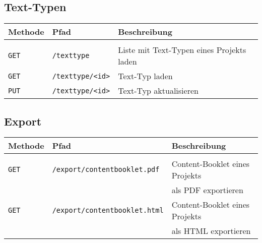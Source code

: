 \subsection{Text-Typen}

\begin{tabular}{@{}l l l}
\textbf{Methode} & \textbf{Pfad} & \textbf{Beschreibung}\\
\hline\\[-1.5ex]
\texttt{GET} & \texttt{/texttype} & Liste mit Text-Typen eines Projekts laden\\
\texttt{GET} & \texttt{/texttype/<id>} & Text-Typ laden\\
\texttt{PUT} & \texttt{/texttype/<id>} & Text-Typ aktualisieren\\
\end{tabular}

\subsection{Export}

\begin{tabular}{@{}l l l}
\textbf{Methode} & \textbf{Pfad} & \textbf{Beschreibung}\\
\hline\\[-1.5ex]
\texttt{GET} & \texttt{/export/contentbooklet.pdf} & Content-Booklet eines Projekts\\
&&als PDF exportieren\\
\texttt{GET} & \texttt{/export/contentbooklet.html} & Content-Booklet eines Projekts\\
&&als HTML exportieren\\
\end{tabular}
